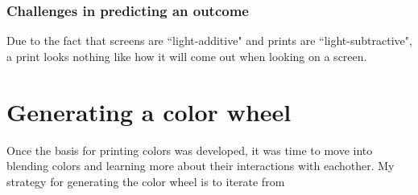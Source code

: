 \documentclass{article}
\begin{document}
\begin{multicols}{2}
\subsubsection{Challenges in predicting an outcome}

Due to the fact that screens are ``light-additive" and prints are ``light-subtractive", a print looks nothing like how it will come out when looking on a screen.

\section{Generating a color wheel}

Once the basis for printing colors was developed, it was time to move into blending colors and learning more about their interactions with eachother. My strategy for generating the color wheel is to iterate from 

\end{multicols}
\end{document}
